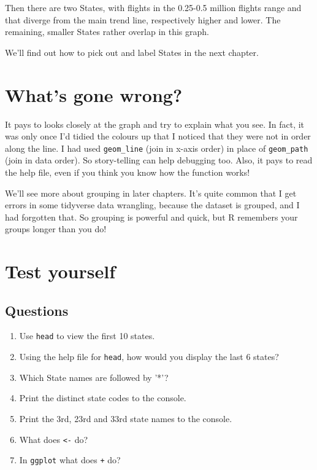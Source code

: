 \documentclass[
]{book}
\providecommand{\tightlist}{%
  \setlength{\itemsep}{0pt}\setlength{\parskip}{0pt}}
\begin{document}
Then there are two States, with flights in the 0.25-0.5 million flights range and that diverge from the main trend line, respectively higher and lower. The remaining, smaller States rather overlap in this graph.

We'll find out how to pick out and label States in the next chapter.

\hypertarget{whats-gone-wrong-2}{%
\section{What's gone wrong?}\label{whats-gone-wrong-2}}

It pays to looks closely at the graph and try to explain what you see. In fact, it was only once I'd tidied the colours up that I noticed that they were not in order along the line. I had used \texttt{geom\_line} (join in x-axis order) in place of \texttt{geom\_path} (join in data order). So story-telling can help debugging too. Also, it pays to read the help file, even if you think you know how the function works!

We'll see more about grouping in later chapters. It's quite common that I get errors in some tidyverse data wrangling, because the dataset is grouped, and I had forgotten that. So grouping is powerful and quick, but R remembers your groups longer than you do!

\hypertarget{test-yourself-1}{%
\section{Test yourself}\label{test-yourself-1}}

\hypertarget{questions-1}{%
\subsection{Questions}\label{questions-1}}

\begin{enumerate}
\def\labelenumi{\arabic{enumi})}
\tightlist
\item
  Use \texttt{head} to view the first 10 states.
\item
  Using the help file for \texttt{head}, how would you display the last 6 states?
\item
  Which State names are followed by '*'?
\item
  Print the distinct state codes to the console.
\item
  Print the 3rd, 23rd and 33rd state names to the console.
\item
  What does \texttt{\textless{}-} do?
\item
  In \texttt{ggplot} what does \texttt{+} do?
\end{enumerate}
\end{document}
